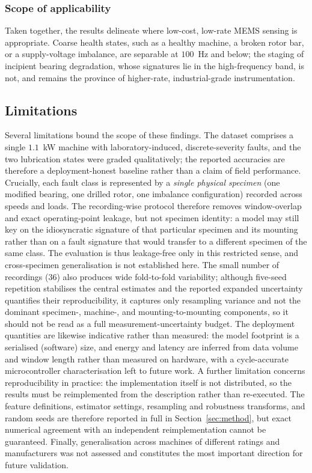 \subsubsection{Scope of applicability}
Taken together, the results delineate where low-cost, low-rate MEMS sensing is
appropriate. Coarse health states, such as a healthy machine, a broken rotor bar,
or a supply-voltage imbalance, are separable at $100$~Hz and below; the staging of
incipient bearing degradation, whose signatures lie in the high-frequency band, is
not, and remains the province of higher-rate, industrial-grade instrumentation.

\subsection{Limitations}
\label{subsec:limits}
Several limitations bound the scope of these findings. The dataset comprises a
single $1.1$~kW machine with laboratory-induced, discrete-severity faults, and the
two lubrication states were graded qualitatively; the reported accuracies are
therefore a deployment-honest baseline rather than a claim of field performance.
Crucially, each fault class is represented by a \emph{single physical specimen}
(one modified bearing, one drilled rotor, one imbalance configuration) recorded
across speeds and loads. The recording-wise protocol therefore removes
window-overlap and exact operating-point leakage, but not specimen identity: a
model may still key on the idiosyncratic signature of that particular specimen and
its mounting rather than on a fault signature that would transfer to a different
specimen of the same class. The evaluation is thus leakage-free only in this
restricted sense, and cross-specimen generalisation is not established here. The
small number of recordings ($36$) also produces wide fold-to-fold variability;
although five-seed repetition stabilises the central estimates and the reported
expanded uncertainty quantifies their reproducibility, it captures only resampling
variance and not the dominant specimen-, machine-, and mounting-to-mounting
components, so it should not be read as a full measurement-uncertainty budget. The
deployment quantities are likewise indicative rather than measured: the model
footprint is a serialised (software) size, and energy and latency are inferred
from data volume and window length rather than measured on hardware, with a
cycle-accurate microcontroller characterisation left to future work. A further limitation concerns
reproducibility in practice: the implementation itself is not distributed, so the
results must be reimplemented from the description rather than re-executed. The
feature definitions, estimator settings, resampling and robustness transforms,
and random seeds are therefore reported in full in Section~\ref{sec:method},
but exact numerical agreement with an independent reimplementation cannot be
guaranteed. Finally,
generalisation across machines of different ratings and manufacturers was not
assessed and constitutes the most important direction for future validation.
